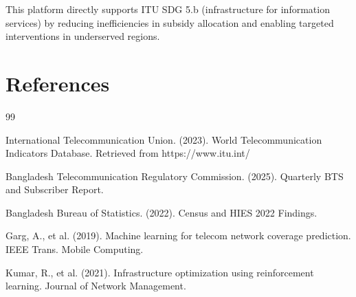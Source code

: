 \documentclass[11pt,a4paper]{article}
\begin{document}
This platform directly supports ITU SDG 5.b (infrastructure for information services) by reducing inefficiencies in subsidy allocation and enabling targeted interventions in underserved regions.

\section*{References}

\begin{thebibliography}{99}

 International Telecommunication Union. (2023). World Telecommunication Indicators Database. Retrieved from https://www.itu.int/

 Bangladesh Telecommunication Regulatory Commission. (2025). Quarterly BTS and Subscriber Report.

 Bangladesh Bureau of Statistics. (2022). Census and HIES 2022 Findings.

 Garg, A., et al. (2019). Machine learning for telecom network coverage prediction. IEEE Trans. Mobile Computing.

 Kumar, R., et al. (2021). Infrastructure optimization using reinforcement learning. Journal of Network Management.

\end{thebibliography}
\end{document}
